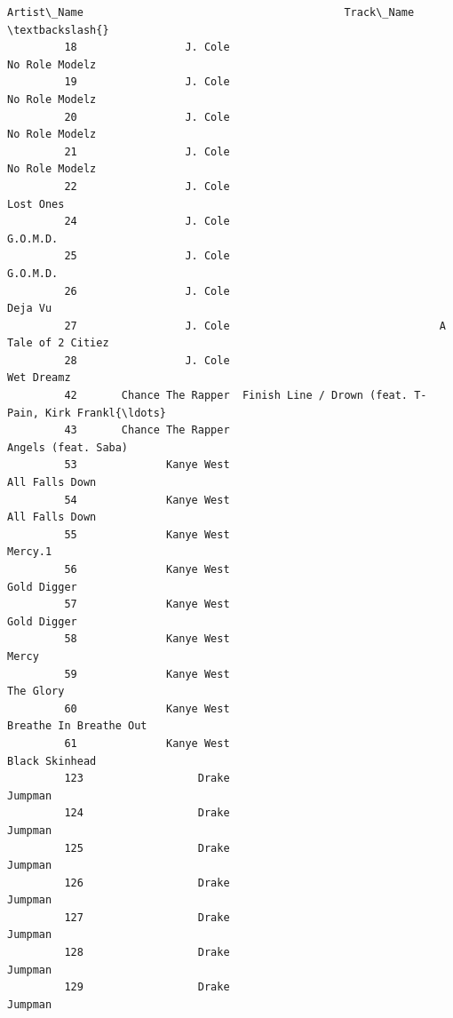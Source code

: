 \documentclass[11pt]{article}
\begin{document}
\begin{Verbatim}[commandchars=\\\{\}]
                        Artist\_Name                                         Track\_Name  \textbackslash{}
         18                 J. Cole                                     No Role Modelz   
         19                 J. Cole                                     No Role Modelz   
         20                 J. Cole                                     No Role Modelz   
         21                 J. Cole                                     No Role Modelz   
         22                 J. Cole                                          Lost Ones   
         24                 J. Cole                                           G.O.M.D.   
         25                 J. Cole                                           G.O.M.D.   
         26                 J. Cole                                            Deja Vu   
         27                 J. Cole                                 A Tale of 2 Citiez   
         28                 J. Cole                                         Wet Dreamz   
         42       Chance The Rapper  Finish Line / Drown (feat. T-Pain, Kirk Frankl{\ldots}   
         43       Chance The Rapper                                Angels (feat. Saba)   
         53              Kanye West                                     All Falls Down   
         54              Kanye West                                     All Falls Down   
         55              Kanye West                                            Mercy.1   
         56              Kanye West                                        Gold Digger   
         57              Kanye West                                        Gold Digger   
         58              Kanye West                                              Mercy   
         59              Kanye West                                          The Glory   
         60              Kanye West                             Breathe In Breathe Out   
         61              Kanye West                                     Black Skinhead   
         123                  Drake                                            Jumpman   
         124                  Drake                                            Jumpman   
         125                  Drake                                            Jumpman   
         126                  Drake                                            Jumpman   
         127                  Drake                                            Jumpman   
         128                  Drake                                            Jumpman   
         129                  Drake                                            Jumpman   

\end{Verbatim}
\end{document}
